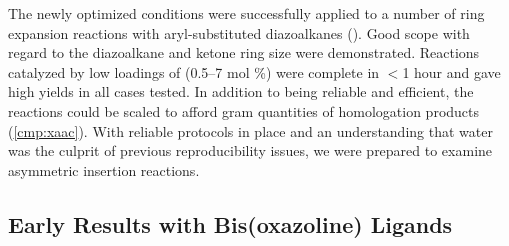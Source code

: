 The newly optimized conditions were successfully applied to a number of ring expansion reactions
with aryl-substituted diazoalkanes ().
Good scope with regard to the diazoalkane and ketone ring size were demonstrated. Reactions
catalyzed by low loadings of  (0.5--7 mol \%) were complete in $<$1 hour and gave high
yields in all cases tested. In addition to being reliable and efficient, the reactions could be
scaled to afford gram quantities of homologation products (\ce{->}\ref{cmp:xaac}). With reliable
protocols in place and an understanding that water was the culprit of previous reproducibility
issues, we were prepared to examine asymmetric insertion reactions. 

\subsection{Early Results with Bis(oxazoline) Ligands}

